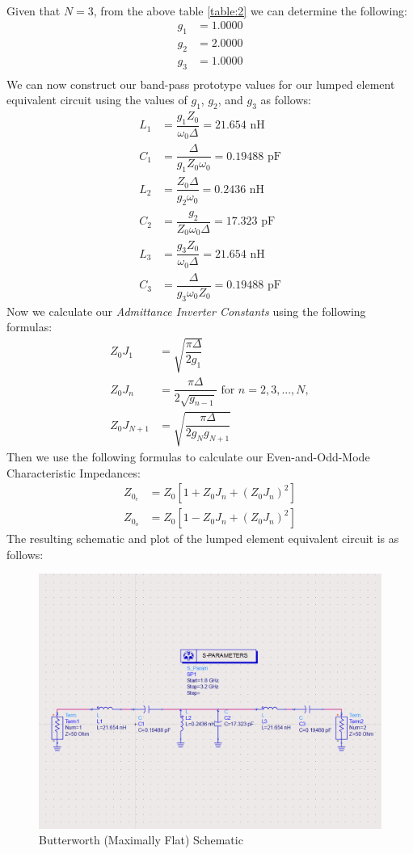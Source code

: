 \documentclass{article}
\begin{document}
\text{ }\\
Given that $N=3$, from the above table \ref{table:2} we can determine the following:
\begin{align*}
    g_1 &= 1.0000 \\
    g_2 &= 2.0000 \\
    g_3 &= 1.0000 \\
\end{align*}
We can now construct our band-pass prototype values for our lumped element equivalent circuit using the values of $g_1$, $g_2$, and $g_3$ as follows:
\begin{align}
    L_1 &= \dfrac{g_1 Z_0}{\omega_0 \Delta} = 21.654 \text{ nH} \\
    C_1 &= \dfrac{\Delta}{g_1 Z_0 \omega_0} = 0.19488 \text{ pF} \\
    L_2 &= \dfrac{Z_0 \Delta}{g_2 \omega_0} = 0.2436 \text{ nH} \\
    C_2 &= \dfrac{g_2}{Z_0 \omega_0 \Delta} = 17.323 \text{ pF} \\
    L_3 &= \dfrac{g_3 Z_0}{\omega_0 \Delta} = 21.654 \text{ nH} \\
    C_3 &= \dfrac{\Delta}{g_3 \omega_0 Z_0} = 0.19488 \text{ pF}
\end{align}
Now we calculate our \textit{Admittance Inverter Constants} using the following formulas:
\begin{align}
    Z_0 J_1 &= \sqrt{\dfrac{\pi \Delta}{2g_1}} \\
    Z_0 J_n &= \dfrac{\pi \Delta}{2\sqrt{g_{n-1}}} \text{ for } n = 2, 3,...,N,\\
    Z_0 J_{N+1} &= \sqrt{\dfrac{\pi \Delta}{2g_N g_{N+1}}}
\end{align}
Then we use the following formulas to calculate our Even-and-Odd-Mode Characteristic Impedances:
\begin{align}
    Z_{0_e} &= Z_0\left[ 1 + Z_0 J_n + (Z_0 J_n)^2 \right]\\
    Z_{0_o} &= Z_0\left[ 1 - Z_0 J_n + (Z_0 J_n)^2 \right]
\end{align}
The resulting schematic and plot of the lumped element equivalent circuit is as follows:
\begin{figure}[h!]
    \centering
    \includegraphics[scale=0.4]{images/butterworth_schematic.png}
    \caption{Butterworth (Maximally Flat) Schematic}
    \label{fig:2}
\end{figure}
\end{document}

